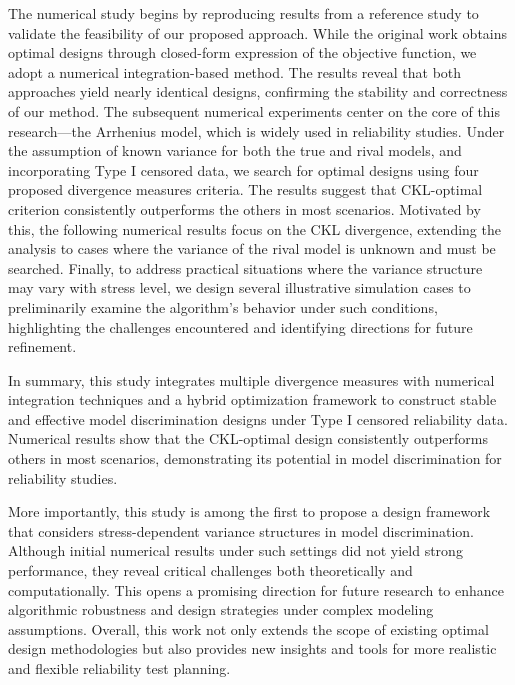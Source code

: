 \hspace*{8mm} The numerical study begins by reproducing results from a reference study to validate the feasibility of our proposed approach. While the original work obtains optimal designs through closed-form expression of the objective function, we adopt a numerical integration-based method. The results reveal that both approaches yield nearly identical designs, confirming the stability and correctness of our method. The subsequent numerical experiments center on the core of this research—the Arrhenius model, which is widely used in reliability studies. Under the assumption of known variance for both the true and rival models, and incorporating Type I censored data, we search for optimal designs using four proposed divergence measures criteria. The results suggest that CKL-optimal criterion consistently outperforms the others in most scenarios. Motivated by this, the following numerical results focus on the CKL divergence, extending the analysis to cases where the variance of the rival model is unknown and must be searched. Finally, to address practical situations where the variance structure may vary with stress level, we design several illustrative simulation cases to preliminarily examine the algorithm's behavior under such conditions, highlighting the challenges encountered and identifying directions for future refinement.

\hspace*{8mm} In summary, this study integrates multiple divergence measures with numerical integration techniques and a hybrid optimization framework to construct stable and effective model discrimination designs under Type I censored reliability data. Numerical results show that the CKL-optimal design consistently outperforms others in most scenarios, demonstrating its potential in model discrimination for reliability studies.

\hspace*{8mm} More importantly, this study is among the first to propose a design framework that considers stress-dependent variance structures in model discrimination. Although initial numerical results under such settings did not yield strong performance, they reveal critical challenges both theoretically and computationally. This opens a promising direction for future research to enhance algorithmic robustness and design strategies under complex modeling assumptions. Overall, this work not only extends the scope of existing optimal design methodologies but also provides new insights and tools for more realistic and flexible reliability test planning.

